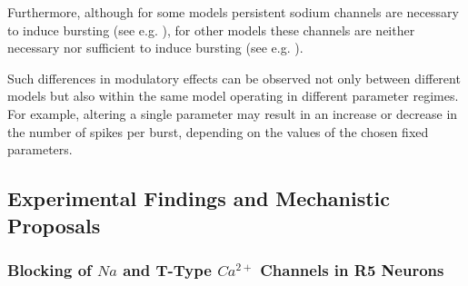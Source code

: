 \documentclass[../main.tex]{subfiles}
\begin{document}
Furthermore, although for some models persistent sodium channels are necessary to induce bursting (see e.g. \parencite{liuMultipleConductancesCooperatively2008,wangMultipleDynamicalModes1994}), for other models these channels are neither necessary nor sufficient to induce bursting (see e.g. \parencite{golombContributionPersistentNa2006}).

Such differences in modulatory effects can be observed not only between different models but also within the same model operating in different parameter regimes. For example, altering a single parameter may result in an increase or decrease in the number of spikes per burst, depending on the values of the chosen fixed parameters.










\subsection{Experimental Findings and Mechanistic Proposals}

\subsubsection{\texorpdfstring{Blocking of $Na$ and T-Type $Ca^{2+}$ Channels in R5 Neurons}{Blocking of Na and T-Type Ca2+ Channels in R5 Neurons}} \label{subsubsec:experiment_ttx_t_type_block}
\end{document}
